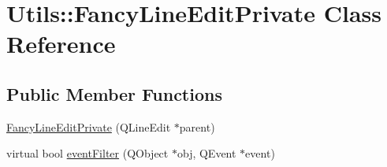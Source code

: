 \hypertarget{class_utils_1_1_fancy_line_edit_private}{\section{\-Utils\-:\-:\-Fancy\-Line\-Edit\-Private \-Class \-Reference}
\label{class_utils_1_1_fancy_line_edit_private}
}
\subsection*{\-Public \-Member \-Functions}
\begin{DoxyCompactItemize}
\item 
\hyperlink{class_utils_1_1_fancy_line_edit_private_af49fb87ff7f87da0007164d98cf19b4f}{\-Fancy\-Line\-Edit\-Private} (\-Q\-Line\-Edit $\ast$parent)
\item 
virtual bool \hyperlink{class_utils_1_1_fancy_line_edit_private_a913ad07243b3e212d5ee1a55e47d080d}{event\-Filter} (\-Q\-Object $\ast$obj, \-Q\-Event $\ast$event)
\end{DoxyCompactItemize}
